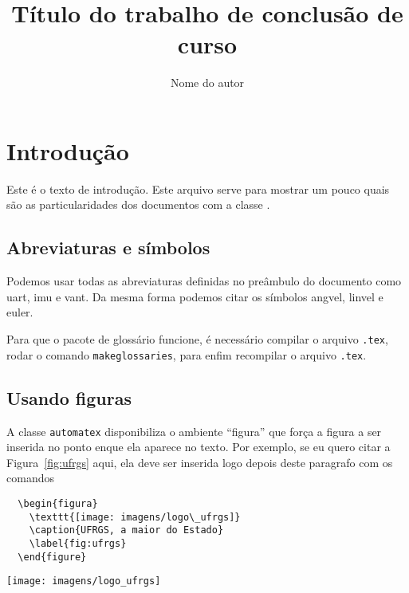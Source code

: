 \documentclass{automatex}
\title{Título do trabalho de conclusão de curso}
\author{Nome do autor}
\begin{document}
\maketitle %

\section{Introdução}

Este é o texto de introdução. Este arquivo serve para mostrar um pouco quais são as particularidades dos documentos com a classe \automatex.

\subsection{Abreviaturas e símbolos}

Podemos usar todas as abreviaturas definidas no preâmbulo do documento como \gls{uart}, \gls{imu} e \gls{vant}. Da mesma forma podemos citar os símbolos \gls{angvel}, \gls{linvel} e \gls{euler}.

Para que o pacote de glossário funcione, é necessário compilar o arquivo \verb+.tex+, rodar o comando \verb+makeglossaries+, para enfim recompilar o arquivo \verb+.tex+.

\subsection{Usando figuras}

A classe \verb+automatex+ disponibiliza o ambiente ``figura'' que força a figura a ser inserida no ponto enque ela aparece no texto. Por exemplo, se eu quero citar a Figura~\ref{fig:ufrgs} aqui, ela deve ser inserida logo depois deste paragrafo com os comandos
\begin{verbatim}
  \begin{figura}
    \texttt{[image: imagens/logo\_ufrgs]}
    \caption{UFRGS, a maior do Estado}
    \label{fig:ufrgs}
  \end{figure}
\end{verbatim}

\begin{figura}
  \texttt{[image: imagens/logo\_ufrgs]}
  \caption{UFRGS, a maior do Estado}
  \label{fig:ufrgs}
\end{figura}
\end{document}
